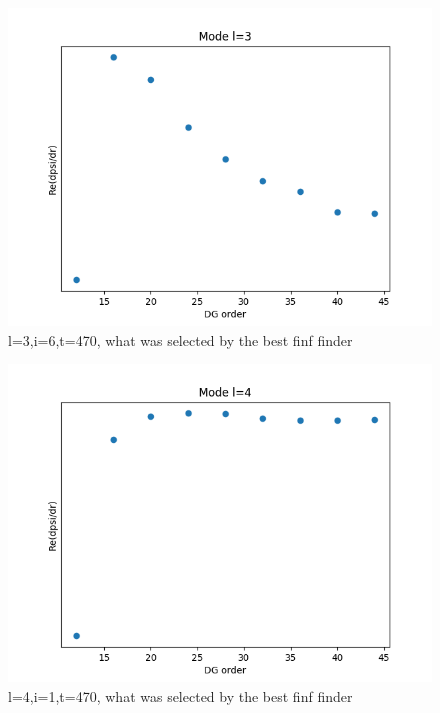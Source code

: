 \documentclass{article}
\begin{document}
\begin{figure}
  \includegraphics{subtractoffsett470l3}
  \caption{l=3,i=6,t=470, what was selected by the best finf finder}
\end{figure}
\begin{figure}
  \includegraphics{subtractoffsett470l4i1}
  \caption{l=4,i=1,t=470, what was selected by the best finf finder}
\end{figure}
\end{document}

